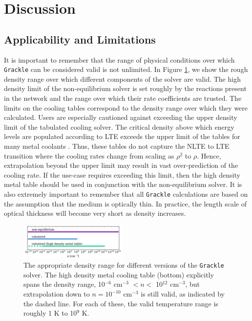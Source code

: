 \section{Discussion} \label{sec:summary}

\subsection{Applicability and Limitations}

It is important to remember that the range of physical conditions over
which \texttt{Grackle} can be considered valid is not unlimited.  In Figure
\ref{fig:valid-range}, we show the rough density range over which
different components of the solver are valid.  The high density limit
of the non-equilibrium solver is set roughly by the reactions present
in the network and the range over which their rate coefficients are
trusted.  The limits on the cooling tables correspond to the density
range over which they were calculated.  Users are especially
cautioned against exceeding the upper density limit of the tabulated
cooling solver.  The critical density above which energy levels are
populated according to LTE exceeds the upper limit of the tables for
many metal coolants \citep{2008MNRAS.385.1443S}.  Thus, these tables
do not capture the NLTE to LTE transition where the cooling rates
change from scaling as $\rho^{2}$ to $\rho$.  Hence, extrapolation
beyond the upper limit may result in vast over-prediction of the
cooling rate.  If the use-case requires exceeding this limit, then the
high density metal table should be used in conjunction with the
non-equilibrium solver.  It is also extremely important to remember
that all \texttt{Grackle} calculations are based on the assumption that the
medium is optically thin.  In practice, the length scale of optical
thickness will become very short as density increases.

\begin{figure}
  \centering
  \includegraphics[width=0.48\textwidth]{valid_range.pdf}
  \caption{
    The appropriate density range for different versions of the
    \texttt{Grackle} solver.  The high density metal cooling table (bottom)
    explicitly spans the density range, 10$^{-6}$ cm$^{-3}$ $< n <$
    10$^{12}$ cm$^{-3}$, but extrapolation down to $n = 10^{-10}$ cm$^{-3}$ 
    is still valid, as indicated by the dashed line.  For each
    of these, the valid temperature range is roughly 1 K to 10$^{9}$
    K.
  } \label{fig:valid-range}
\end{figure}

